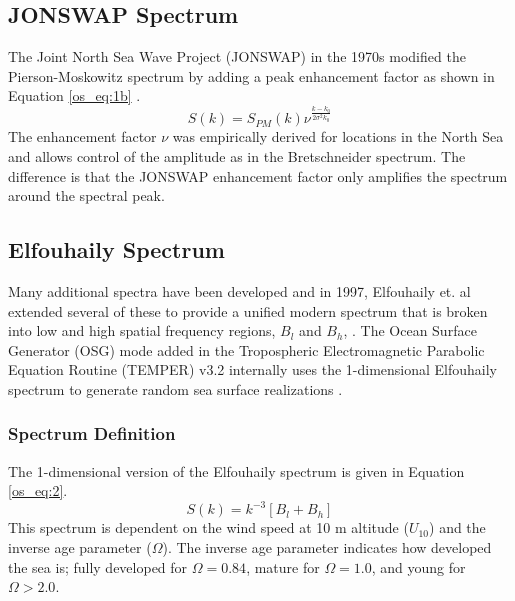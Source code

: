 \subsection{JONSWAP Spectrum}
The Joint North Sea Wave Project (JONSWAP) in the 1970s modified the Pierson-Moskowitz spectrum by adding a peak enhancement factor as shown in Equation \ref{os_eq:1b} \cite{michel_sea_spectra}.
\begin{equation}
  \label{os_eq:1b}
  S(k) = S_{PM}(k)\nu^{\frac{k-k_0}{2\sigma^2k_0}} 
  \end{equation}
The enhancement factor $\nu$ was empirically derived for locations in the North Sea and allows control of the amplitude as in the Bretschneider spectrum. The difference is that the JONSWAP enhancement factor only amplifies the spectrum around the spectral peak.

\subsection{Elfouhaily Spectrum}
Many additional spectra have been developed and in 1997, Elfouhaily et. al extended several of these to provide a unified modern spectrum that is broken into low and high spatial frequency regions, $B_l$ and $B_h$, \cite{elfouhaily}. The Ocean Surface Generator (OSG) mode added in the Tropospheric Electromagnetic Parabolic Equation Routine (TEMPER) v3.2 internally uses the 1-dimensional Elfouhaily spectrum to generate random sea surface realizations \cite{temper_guide}.

\subsubsection{Spectrum Definition}
The 1-dimensional version of the Elfouhaily spectrum is given in Equation \ref{os_eq:2}.
\begin{equation}
  \label{os_eq:2}
  S(k) = k^{-3}\left[B_l + B_h \right]
\end{equation}
\renewcommand{\baselinestretch}{2} \small\normalsize
This spectrum is dependent on the wind speed at 10 m altitude ($U_{10}$) and the inverse age parameter ($\Omega$). The inverse age parameter indicates how developed the sea is; fully developed for $\Omega = 0.84$, mature for $\Omega = 1.0$, and young for $\Omega > 2.0$. 

